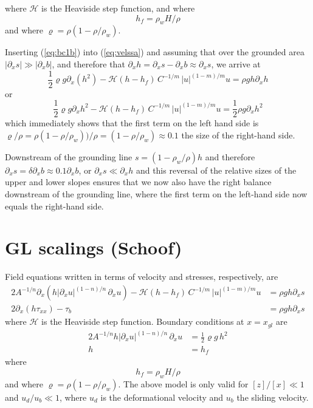 \documentclass[10pt,a4paper]{book}
\newcommand{\He}{\mathcal{H}}
\newcommand{\p}{\partial}
\newcommand{\txx}{\tau_{xx}}
\begin{document}
where $\He$ is the Heaviside step function, and
where
\[
h_f=\rho_w H/\rho
\]
and where $\varrho=\rho (1-\rho/\rho_w)$. 

Inserting (\ref{eq:bc1b}) into (\ref{eq:velssa}) and assuming that over the grounded area 
$ |\p_x s| \gg |\p_x b|$, and therefore that $\p_x h = \p_x s - \p_x b \approx \p_x s $, we arrive at
\[
\frac{1}{2} \varrho g \p_x \left ( h^2  \right ) - \He(h-h_f) \, C^{-1/m} \, |u|^{(1-m)/m} u = \rho g h \p_x h  \label{eq:velssa2}
\]
or
\[
\frac{1}{2} \varrho g \p_x  h^2  - \He(h-h_f) \, C^{-1/m} \, |u|^{(1-m)/m} u = \frac{1}{2} \rho g  \p_x h^2  \label{eq:velssa3}
\]
which immediately shows that the first term on the left hand side is
$\varrho /\rho=\rho (1-\rho/\rho_w))/\rho=(1-\rho/\rho_w) \approx 0.1 $
the size of the right-hand side.

Downstream of the grounding line $s=(1-\rho_w/\rho) h$ and therefore
$\p_x s = \delta \p_x b \approx 0.1 \p_x b$, or
$\p_x s \ll \p_x h $ and this reversal of the relative sizes of the upper
and lower slopes ensures that we now also have the right balance
downstream of the grounding line, where the first term on the left-hand side now equals the right-hand side.




\section{GL scalings  (Schoof)}

\setcounter{equation}{0}
Field equations written in terms of velocity and stresses, respectively, are
\begin{align}
2 A^{-1/n} \p_x \left (h |\p_x u|^{(1-n)/n} \, \p_x u \right ) - \He(h-h_f) \, C^{-1/m} \, |u|^{(1-m)/m} u & = \rho g h \p_x s  \label{eq:vel}\\
     2 \p_x \left ( h \txx \right )  - \tau_b & = \rho g h \p_x s  \label{eq:stress} 
\end{align}
where $\He$ is the Heaviside step function.
Boundary conditions at $x=x_{gl}$ are
\begin{align}
2 A^{-1/n} h |\p_x u|^{(1-n)/n}   \, \p_x u & = \frac{1}{2} \varrho g \, h^2  \label{eq:bc1c} \\
h&=h_f   \label{eq:bc2c}
\end{align}
where
\[
h_f=\rho_w H/\rho
\]
and where $\varrho=\rho (1-\rho/\rho_w)$. The above model is only valid for $[z]/[x] \ll 1 $
and $u_d/u_b\ll 1$, where $u_d$ is the deformational velocity and
$u_b$ the sliding velocity.
\end{document}
